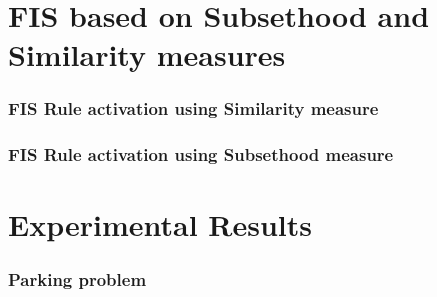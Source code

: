 \documentclass{beamer}
\begin{document}

\section{FIS based on Subsethood and Similarity measures}


\begin{frame}
\frametitle{FIS Rule activation using Similarity measure}
\end{frame}

\begin{frame}
\frametitle{FIS Rule activation using Subsethood measure}
\end{frame}


\section{Experimental Results}

\begin{frame}
\frametitle{Parking problem}
\end{frame}



\end{document}

